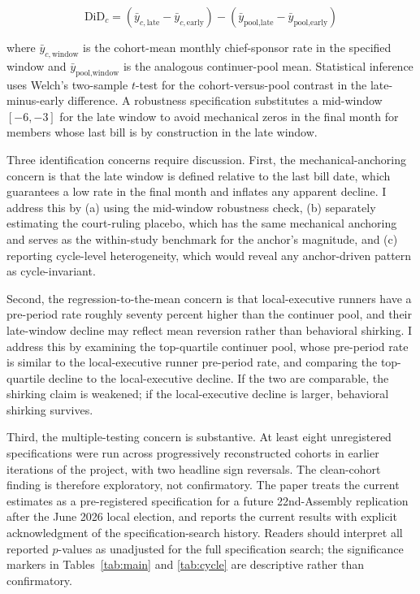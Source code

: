 \documentclass[11pt]{article}
\begin{document}
\begin{equation}
\text{DiD}_c = \left(\bar{y}_{c, \text{late}} - \bar{y}_{c, \text{early}}\right) - \left(\bar{y}_{\text{pool}, \text{late}} - \bar{y}_{\text{pool}, \text{early}}\right)
\label{eq:did}
\end{equation}

where $\bar{y}_{c, \text{window}}$ is the cohort-mean monthly chief-sponsor rate in the specified window and $\bar{y}_{\text{pool}, \text{window}}$ is the analogous continuer-pool mean. Statistical inference uses Welch's two-sample $t$-test for the cohort-versus-pool contrast in the late-minus-early difference. A robustness specification substitutes a mid-window $[-6, -3]$ for the late window to avoid mechanical zeros in the final month for members whose last bill is by construction in the late window.

Three identification concerns require discussion. First, the mechanical-anchoring concern is that the late window is defined relative to the last bill date, which guarantees a low rate in the final month and inflates any apparent decline. I address this by (a) using the mid-window robustness check, (b) separately estimating the court-ruling placebo, which has the same mechanical anchoring and serves as the within-study benchmark for the anchor's magnitude, and (c) reporting cycle-level heterogeneity, which would reveal any anchor-driven pattern as cycle-invariant.

Second, the regression-to-the-mean concern is that local-executive runners have a pre-period rate roughly seventy percent higher than the continuer pool, and their late-window decline may reflect mean reversion rather than behavioral shirking. I address this by examining the top-quartile continuer pool, whose pre-period rate is similar to the local-executive runner pre-period rate, and comparing the top-quartile decline to the local-executive decline. If the two are comparable, the shirking claim is weakened; if the local-executive decline is larger, behavioral shirking survives.

Third, the multiple-testing concern is substantive. At least eight unregistered specifications were run across progressively reconstructed cohorts in earlier iterations of the project, with two headline sign reversals. The clean-cohort finding is therefore exploratory, not confirmatory. The paper treats the current estimates as a pre-registered specification for a future 22nd-Assembly replication after the June 2026 local election, and reports the current results with explicit acknowledgment of the specification-search history. Readers should interpret all reported $p$-values as unadjusted for the full specification search; the significance markers in Tables~\ref{tab:main} and \ref{tab:cycle} are descriptive rather than confirmatory.
\end{document}

